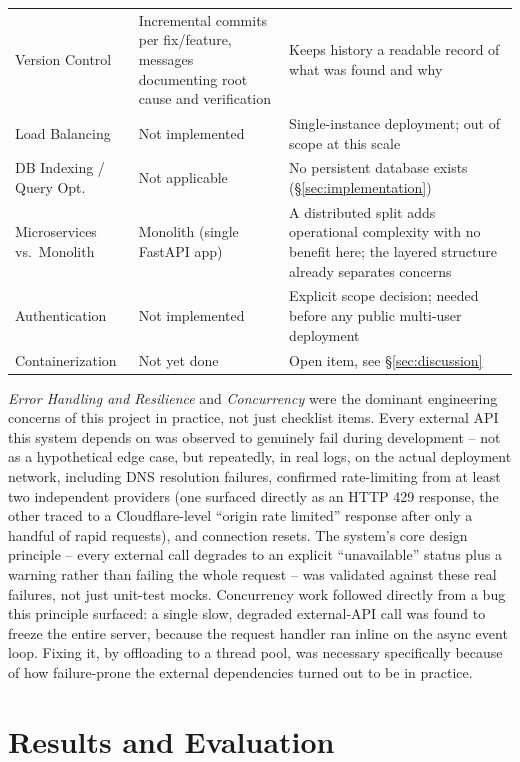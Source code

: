\documentclass[manuscript,screen]{acmart}
\begin{document}
\begin{table}[t]
\begin{tabular}{p{2.5cm}p{5.4cm}p{6.4cm}}
    Version Control & Incremental commits per fix/feature, messages documenting root cause and verification & Keeps history a readable record of what was found and why \\
    Load Balancing & Not implemented & Single-instance deployment; out of scope at this scale \\
    DB Indexing / Query Opt. & Not applicable & No persistent database exists (\S\ref{sec:implementation}) \\
    Microservices vs.\ Monolith & Monolith (single FastAPI app) & A distributed split adds operational complexity with no benefit here; the layered structure already separates concerns \\
    Authentication & Not implemented & Explicit scope decision; needed before any public multi-user deployment \\
    Containerization & Not yet done & Open item, see \S\ref{sec:discussion} \\
    \bottomrule
  \end{tabular}
\end{table}

\emph{Error Handling and Resilience} and \emph{Concurrency} were the
dominant engineering concerns of this project in practice, not just
checklist items. Every external API this system depends on was observed
to genuinely fail during development -- not as a hypothetical edge case,
but repeatedly, in real logs, on the actual deployment network, including
DNS resolution failures, confirmed rate-limiting from at least two
independent providers (one surfaced directly as an HTTP 429 response, the
other traced to a Cloudflare-level ``origin rate limited'' response after
only a handful of rapid requests), and connection resets. The system's
core design principle -- every external call degrades to an explicit
``unavailable'' status plus a warning rather than failing the whole
request -- was validated against these real failures, not just
unit-test mocks. Concurrency work followed directly from a bug this
principle surfaced: a single slow, degraded external-API call was found
to freeze the entire server, because the request handler ran inline on
the async event loop. Fixing it, by offloading to a thread pool, was
necessary specifically because of how failure-prone the external
dependencies turned out to be in practice.

\section{Results and Evaluation}
\label{sec:results}
\end{document}

